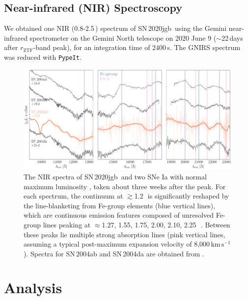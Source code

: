 \documentclass[twocolumn]{aastex631}
\newcommand{\sn}{SN\,2020jgb}
\newcommand{\kms}{$\mathrm{km}\,\mathrm{s}^{-1}$}
\begin{document}
\subsection{Near-infrared (NIR) Spectroscopy}
We obtained one NIR (0.8-2.5\,\micron) spectrum of \sn\ using the Gemini near-infrared spectrometer \citep[GNIRS;][]{GNIRS1998} on the Gemini North telescope on 2020 June 9 ($\sim$22\,days after $r_\mathrm{ZTF}$-band peak), for an integration time of 2400\,s. The GNIRS spectrum was reduced with \texttt{PypeIt}.

\begin{figure}
    \centering
    \includegraphics[width=\textwidth]{NIR_spec.pdf}
    \caption{The NIR spectra of \sn\ and two SNe Ia with normal maximum luminosity \citep[SN\,2004ab and SN\,2004da,][]{Marion2009_NIR}, taken about three weeks after the peak. For each spectrum, the continuum at $\gtrsim$1.2\,\micron\ is significantly reshaped by the line-blanketing from Fe-group elements (blue vertical lines), which are continuous emission features composed of unresolved Fe-group lines peaking at $\approx$1.27, 1.55, 1.75, 2.00, 2.10, 2.25\,\micron\ \citep{Marion2009_NIR}. Between these peaks lie multiple strong  absorption lines (pink vertical lines, assuming a typical post-maximum expansion velocity of 8,000\,\kms). Spectra for SN\,2004ab and SN\,2004da are obtained from \citet{Marion2009_NIR}.}
    \label{fig:NIR_spec}
\end{figure}

\section{Analysis} \label{sec:analysis}
\end{document}
